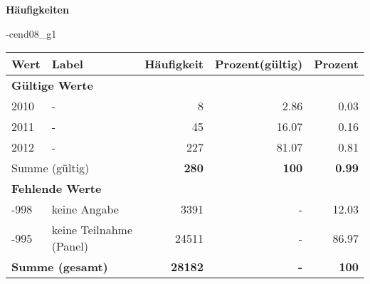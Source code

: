        		\vspace*{0.5cm}
                \noindent\textbf{Häufigkeiten}

                \vspace*{-\baselineskip}
					\begin{filecontents}{\jobname-cend08_g1}
					\begin{longtable}{lXrrr}
					\toprule
					\textbf{Wert} & \textbf{Label} & \textbf{Häufigkeit} & \textbf{Prozent(gültig)} & \textbf{Prozent} \\
					\endhead
					\midrule
					\multicolumn{5}{l}{\textbf{Gültige Werte}}\\

					2010 &
					\multicolumn{1}{X}{ -  } &


					  \num{8} &
					  \num[round-mode=places,round-precision=2]{2.86} &
					    \num[round-mode=places,round-precision=2]{0.03} \\

					2011 &
					\multicolumn{1}{X}{ -  } &


					  \num{45} &
					  \num[round-mode=places,round-precision=2]{16.07} &
					    \num[round-mode=places,round-precision=2]{0.16} \\

					2012 &
					\multicolumn{1}{X}{ -  } &


					  \num{227} &
					  \num[round-mode=places,round-precision=2]{81.07} &
					    \num[round-mode=places,round-precision=2]{0.81} \\
					\midrule
					\multicolumn{2}{l}{Summe (gültig)} &
					  \textbf{\num{280}} &
					\textbf{\num{100}} &
					  \textbf{\num[round-mode=places,round-precision=2]{0.99}} \\
					\multicolumn{5}{l}{\textbf{Fehlende Werte}}\\
							-998 &
							keine Angabe &
							  \num{3391} &
							 - &
							  \num[round-mode=places,round-precision=2]{12.03} \\
							-995 &
							keine Teilnahme (Panel) &
							  \num{24511} &
							 - &
							  \num[round-mode=places,round-precision=2]{86.97} \\
					\midrule
					\multicolumn{2}{l}{\textbf{Summe (gesamt)}} &
				      \textbf{\num{28182}} &
				    \textbf{-} &
				    \textbf{\num{100}} \\
					\bottomrule
					\end{longtable}
					\end{filecontents}

